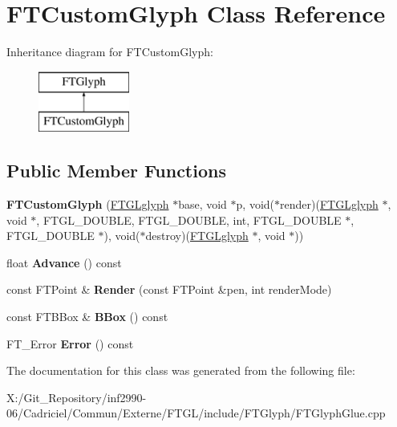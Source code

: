 \hypertarget{class_f_t_custom_glyph}{\section{F\-T\-Custom\-Glyph Class Reference}
\label{class_f_t_custom_glyph}
}
Inheritance diagram for F\-T\-Custom\-Glyph\-:\begin{figure}[H]
\begin{center}
\leavevmode
\includegraphics[height=2.000000cm]{class_f_t_custom_glyph}
\end{center}
\end{figure}
\subsection*{Public Member Functions}
\begin{DoxyCompactItemize}
\item 
\hypertarget{class_f_t_custom_glyph_a43e4bfa9d8ccb5ae4d0e9c38cf7f01c1}{{\bfseries F\-T\-Custom\-Glyph} (\hyperlink{struct___f_t_g_lglyph}{F\-T\-G\-Lglyph} $\ast$base, void $\ast$p, void($\ast$render)(\hyperlink{struct___f_t_g_lglyph}{F\-T\-G\-Lglyph} $\ast$, void $\ast$, F\-T\-G\-L\-\_\-\-D\-O\-U\-B\-L\-E, F\-T\-G\-L\-\_\-\-D\-O\-U\-B\-L\-E, int, F\-T\-G\-L\-\_\-\-D\-O\-U\-B\-L\-E $\ast$, F\-T\-G\-L\-\_\-\-D\-O\-U\-B\-L\-E $\ast$), void($\ast$destroy)(\hyperlink{struct___f_t_g_lglyph}{F\-T\-G\-Lglyph} $\ast$, void $\ast$))}\label{class_f_t_custom_glyph_a43e4bfa9d8ccb5ae4d0e9c38cf7f01c1}

\item 
\hypertarget{class_f_t_custom_glyph_aa8f17e3a9547eafed913e2b8f9b70958}{float {\bfseries Advance} () const }\label{class_f_t_custom_glyph_aa8f17e3a9547eafed913e2b8f9b70958}

\item 
\hypertarget{class_f_t_custom_glyph_a29285cf4a9b5476a80b01e1678272bd6}{const F\-T\-Point \& {\bfseries Render} (const F\-T\-Point \&pen, int render\-Mode)}\label{class_f_t_custom_glyph_a29285cf4a9b5476a80b01e1678272bd6}

\item 
\hypertarget{class_f_t_custom_glyph_aebed1d1515a24d6410f4c3f44686b75c}{const F\-T\-B\-Box \& {\bfseries B\-Box} () const }\label{class_f_t_custom_glyph_aebed1d1515a24d6410f4c3f44686b75c}

\item 
\hypertarget{class_f_t_custom_glyph_a8a74b76186fb02da48849c3c094fb72e}{F\-T\-\_\-\-Error {\bfseries Error} () const }\label{class_f_t_custom_glyph_a8a74b76186fb02da48849c3c094fb72e}

\end{DoxyCompactItemize}


The documentation for this class was generated from the following file\-:\begin{DoxyCompactItemize}
\item 
X\-:/\-Git\-\_\-\-Repository/inf2990-\/06/\-Cadriciel/\-Commun/\-Externe/\-F\-T\-G\-L/include/\-F\-T\-Glyph/F\-T\-Glyph\-Glue.\-cpp\end{DoxyCompactItemize}
